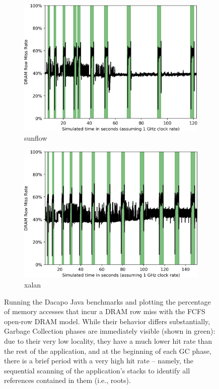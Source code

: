 \begin{figure}
\begin{subfigure}[t]{0.23\textwidth}
		\includegraphics[width=\textwidth]{results/rowmisses_sunflow.png}
		\caption{sunflow}
	\end{subfigure}
	\begin{subfigure}[t]{0.23\textwidth}
		\includegraphics[width=\textwidth]{results/rowmisses_xalan.png}
		\caption{xalan}
	\end{subfigure}
    \caption{Running the Dacapo Java benchmarks and plotting the percentage of
    memory accesses that incur a DRAM row miss with the FCFS open-row DRAM
    model. While their behavior differs substantially, Garbage Collection
    phases are immediately visible (shown in green): due to their very low
    locality, they have a much lower hit rate than the rest of the application,
    and at the beginning of each GC phase, there is a brief period with a very
    high hit rate -- namely, the sequential scanning of the application's
    stacks to identify all references contained in them (i.e., roots).}
	\label{fig:java_rowmisses}
\end{figure}


